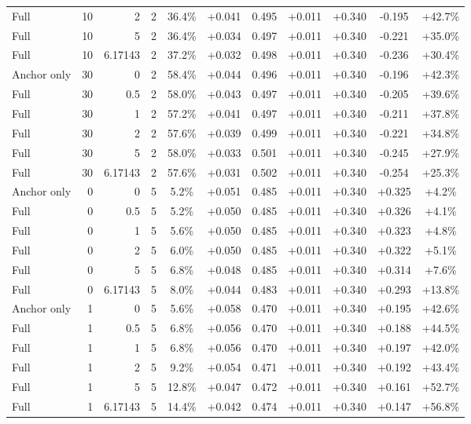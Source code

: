 \begin{table}[htbp]
\begin{tabular}{lrrrccccccc}
Full & 10 & 2 & 2 & 36.4\% & +0.041 & 0.495 & +0.011 & +0.340 & -0.195 & +42.7\% \\
Full & 10 & 5 & 2 & 36.4\% & +0.034 & 0.497 & +0.011 & +0.340 & -0.221 & +35.0\% \\
Full & 10 & 6.17143 & 2 & 37.2\% & +0.032 & 0.498 & +0.011 & +0.340 & -0.236 & +30.4\% \\
Anchor only & 30 & 0 & 2 & 58.4\% & +0.044 & 0.496 & +0.011 & +0.340 & -0.196 & +42.3\% \\
Full & 30 & 0.5 & 2 & 58.0\% & +0.043 & 0.497 & +0.011 & +0.340 & -0.205 & +39.6\% \\
Full & 30 & 1 & 2 & 57.2\% & +0.041 & 0.497 & +0.011 & +0.340 & -0.211 & +37.8\% \\
Full & 30 & 2 & 2 & 57.6\% & +0.039 & 0.499 & +0.011 & +0.340 & -0.221 & +34.8\% \\
Full & 30 & 5 & 2 & 58.0\% & +0.033 & 0.501 & +0.011 & +0.340 & -0.245 & +27.9\% \\
Full & 30 & 6.17143 & 2 & 57.6\% & +0.031 & 0.502 & +0.011 & +0.340 & -0.254 & +25.3\% \\
Anchor only & 0 & 0 & 5 & 5.2\% & +0.051 & 0.485 & +0.011 & +0.340 & +0.325 & +4.2\% \\
Full & 0 & 0.5 & 5 & 5.2\% & +0.050 & 0.485 & +0.011 & +0.340 & +0.326 & +4.1\% \\
Full & 0 & 1 & 5 & 5.6\% & +0.050 & 0.485 & +0.011 & +0.340 & +0.323 & +4.8\% \\
Full & 0 & 2 & 5 & 6.0\% & +0.050 & 0.485 & +0.011 & +0.340 & +0.322 & +5.1\% \\
Full & 0 & 5 & 5 & 6.8\% & +0.048 & 0.485 & +0.011 & +0.340 & +0.314 & +7.6\% \\
Full & 0 & 6.17143 & 5 & 8.0\% & +0.044 & 0.483 & +0.011 & +0.340 & +0.293 & +13.8\% \\
Anchor only & 1 & 0 & 5 & 5.6\% & +0.058 & 0.470 & +0.011 & +0.340 & +0.195 & +42.6\% \\
Full & 1 & 0.5 & 5 & 6.8\% & +0.056 & 0.470 & +0.011 & +0.340 & +0.188 & +44.5\% \\
Full & 1 & 1 & 5 & 6.8\% & +0.056 & 0.470 & +0.011 & +0.340 & +0.197 & +42.0\% \\
Full & 1 & 2 & 5 & 9.2\% & +0.054 & 0.471 & +0.011 & +0.340 & +0.192 & +43.4\% \\
Full & 1 & 5 & 5 & 12.8\% & +0.047 & 0.472 & +0.011 & +0.340 & +0.161 & +52.7\% \\
Full & 1 & 6.17143 & 5 & 14.4\% & +0.042 & 0.474 & +0.011 & +0.340 & +0.147 & +56.8\% \\

\end{tabular}
\end{table}
